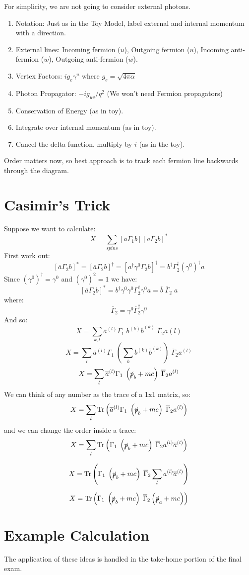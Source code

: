 \documentclass[12pt]{book}
\begin{document}
For simplicity, we are not going to consider external photons.  
\begin{enumerate}
\item Notation:  Just as in the Toy Model, label external and internal momentum with a direction.
\item External lines: Incoming fermion ($u$), Outgoing fermion ($\overline{u}$), 
Incoming anti-fermion ($\overline{w}$), Outgoing anti-fermion ($w$).
\item Vertex Factors:  $i g_e \gamma^u$ where $g_e = \sqrt{4\pi \alpha}$
\item Photon Propagator:  $-ig_{uv}/q^2$  (We won't need Fermion propagators)
\item Conservation of Energy (as in toy).
\item Integrate over internal momentum (as in toy).
\item Cancel the delta function, multiply by $i$ (as in the toy).
\end{enumerate}
Order matters now, so best approach is to track each fermion line backwards through the diagram.


\section{Casimir's Trick}

Suppose we want to calculate:
$$X = \sum_{spins} [\overline{a} \Gamma_1 b][\overline{a} \Gamma_2 b]^* $$
First work out:
$$[\overline{a} \Gamma_2 b]^* = [\overline{a} \Gamma_2 b]^\dagger
= [a^\dagger \gamma^0 \Gamma_2 b]^\dagger = b^\dagger \Gamma_2^\dagger (\gamma^0)^\dagger a$$
Since $(\gamma^0)^\dagger = \gamma^0$ and $(\gamma^0)^2 = 1$ we have:
$$[\overline{a} \Gamma_2 b]^* = b^\dagger \gamma^0 \gamma^0 \Gamma_2^\dagger \gamma^0 a
= \overline{b} \; \overline{\Gamma}_2 \; a$$
where:
$$\overline{\Gamma}_2 = \gamma^0 \overline{\Gamma}_2^\dagger \gamma^0$$
And so:
$$X = \sum_{k,l} \overline{a}^{(l)} \Gamma_1 \; b^{(k)} \overline{b}^{(k)} \; \overline{\Gamma}_2 a(l)$$
$$ X = 
\sum_{l} \overline{a}^{(l)} \Gamma_1 \; \left(\sum_k b^{(k)} \overline{b}^{(k)} \right) \; \overline{\Gamma}_2 a^{(l)}$$
$$ X = 
\sum_{l} \overline{a}^{(l)} \Gamma_1 \; \left(\slashed{p}_b + mc \right) \; \overline{\Gamma}_2 a^{(l)}$$
We can think of any number as the trace of a 1x1 matrix, so:
$$ X = \sum_{l} {\rm Tr}\left(\overline{a}^{(l)} \Gamma_1 \; \left(\slashed{p}_b + mc \right) \; \overline{\Gamma}_2 a^{(l)}\right)$$
and we can change the order inside a trace:
$$ X = \sum_{l} {\rm Tr}\left(\Gamma_1 \; \left(\slashed{p}_b + mc \right) \; \overline{\Gamma}_2 a^{(l)} \overline{a}^{(l)} \right)$$

$$ X = {\rm Tr}\left(\Gamma_1 \; \left(\slashed{p}_b + mc \right) \; \overline{\Gamma}_2 \sum_{l} a^{(l)} \overline{a}^{(l)} \right)$$

$$ X = {\rm Tr}\left(\Gamma_1 \; \left(\slashed{p}_b + mc \right) \; \overline{\Gamma}_2  \left(\slashed{p}_a + mc \right) \right)$$


\section{Example Calculation}

The application of these ideas is handled in the take-home portion of the final exam.
\end{document}

